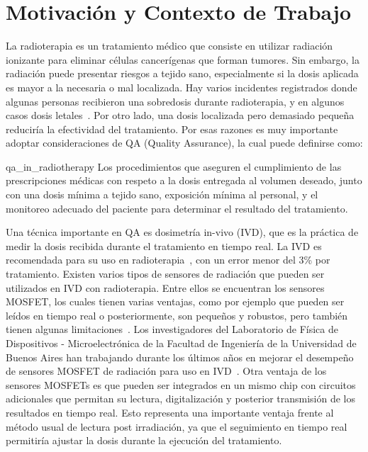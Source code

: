 \documentclass[a4paper, twoside, 11pt]{report}
\begin{document}
\FloatBarrier
\section{Motivación y Contexto de Trabajo}

La radioterapia es un tratamiento médico que consiste en utilizar radiación ionizante para eliminar células cancerígenas que forman tumores. Sin embargo, la radiación puede presentar riesgos a tejido sano, especialmente si la dosis aplicada es mayor a la necesaria o mal localizada. Hay varios incidentes registrados donde algunas personas recibieron una sobredosis durante radioterapia, y en algunos casos dosis letales~\cite{UNSE_2019}. Por otro lado, una dosis localizada pero demasiado pequeña reduciría la efectividad del tratamiento. Por esas razones es muy importante adoptar consideraciones de QA (Quality Assurance), la cual puede definirse como:

\begin{displaycquote}{qa_in_radiotherapy}
Los procedimientos que aseguren el cumplimiento de las prescripciones médicas con respeto a la dosis entregada al volumen deseado, junto con una dosis mínima a tejido sano, exposición mínima al personal, y el monitoreo adecuado del paciente para determinar el resultado del tratamiento.
\end{displaycquote}

Una técnica importante en QA es dosimetría in-vivo (IVD), que es la práctica de medir la dosis recibida durante el tratamiento en tiempo real. La IVD es recomendada para su uso en radioterapia~\cite{AAPM-1994}\cite{ICRP-2000}, con un error menor del 3\% por tratamiento. Existen varios tipos de sensores de radiación que pueden ser utilizados en IVD con radioterapia. Entre ellos se encuentran los sensores MOSFET, los cuales tienen varias ventajas, como por ejemplo que pueden ser leídos en tiempo real o posteriormente, son pequeños y robustos, pero también tienen algunas limitaciones~\cite{UNSE_2019}. Los investigadores del Laboratorio de Física de Dispositivos - Microelectrónica de la Facultad de Ingeniería de la Universidad de Buenos Aires han trabajando durante los últimos años en mejorar el desempeño de sensores MOSFET de radiación para uso en IVD~\cite{mosfet_mismatch_amplification}\cite{6MV_LINAC}. Otra ventaja de los sensores MOSFETs es que pueden ser integrados en un mismo chip con circuitos adicionales que permitan su lectura, digitalización y posterior transmisión de los resultados en tiempo real. Esto representa una importante ventaja frente al método usual de lectura post irradiación, ya que el seguimiento en tiempo real permitiría ajustar la dosis durante la ejecución del tratamiento.
\end{document}
